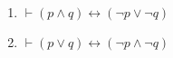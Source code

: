 \documentclass[
    mode=hazy,
    color=blue,
    device=normal,
    lang=cn
]{elegantnote}
\begin{document}
        \begin{proposition}[De. Morgan 律]
            \begin{enumerate}[label=$\arabic*^\circ$]
                \item $\vdash (p\land q)\leftrightarrow (\lnot p\lor \lnot q)$
                \item $\vdash (p\lor q)\leftrightarrow (\lnot p\land \lnot q)$
            \end{enumerate}
        \end{proposition}
\end{document}

